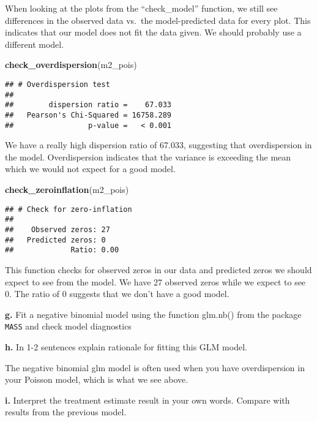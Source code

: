 \documentclass[
]{article}
\newenvironment{Shaded}{\begin{snugshade}}{\end{snugshade}}
\newcommand{\FunctionTok}[1]{\textcolor[rgb]{0.13,0.29,0.53}{\textbf{#1}}}
\newcommand{\NormalTok}[1]{#1}
\begin{document}
When looking at the plots from the ``check\_model'' function, we still
see differences in the observed data vs.~the model-predicted data for
every plot. This indicates that our model does not fit the data given.
We should probably use a different model.

\begin{Shaded}
\begin{Highlighting}[]
\FunctionTok{check\_overdispersion}\NormalTok{(m2\_pois)}
\end{Highlighting}
\end{Shaded}

\begin{verbatim}
## # Overdispersion test
## 
##        dispersion ratio =    67.033
##   Pearson's Chi-Squared = 16758.289
##                 p-value =   < 0.001
\end{verbatim}

We have a really high dispersion ratio of 67.033, suggesting that
overdispersion in the model. Overdispersion indicates that the variance
is exceeding the mean which we would not expect for a good model.

\begin{Shaded}
\begin{Highlighting}[]
\FunctionTok{check\_zeroinflation}\NormalTok{(m2\_pois)}
\end{Highlighting}
\end{Shaded}

\begin{verbatim}
## # Check for zero-inflation
## 
##    Observed zeros: 27
##   Predicted zeros: 0
##             Ratio: 0.00
\end{verbatim}

This function checks for observed zeros in our data and predicted zeros
we should expect to see from the model. We have 27 observed zeros while
we expect to see 0. The ratio of 0 suggests that we don't have a good
model.

\textbf{g.} Fit a negative binomial model using the function glm.nb()
from the package \texttt{MASS} and check model diagnostics

\textbf{h.} In 1-2 sentences explain rationale for fitting this GLM
model.

The negative binomial glm model is often used when you have
overdispersion in your Poisson model, which is what we see above.

\textbf{i.} Interpret the treatment estimate result in your own words.
Compare with results from the previous model.
\end{document}

